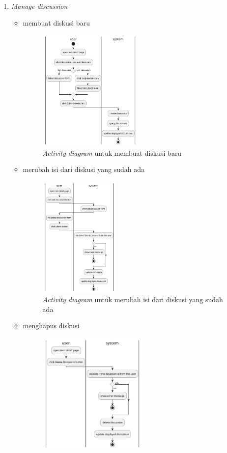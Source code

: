 \documentclass[a4paper]{article}
\begin{document}
\begin{enumerate}
\begin{enumerate}
        \item \textit{Manage discussion}
        \begin{itemize}
            \item membuat diskusi baru
            \begin{figure}[h]
                \centering
                \includegraphics*[height=6cm]{./diagram/activity diagram/14. discussion/create discussion/create discussion.png}
                \caption{\textit{Activity diagram} untuk membuat diskusi baru}
            \end{figure}
            \newpage
            \item merubah isi dari diskusi yang sudah ada
            \begin{figure}[h]
                \centering
                \includegraphics*[height=6cm]{./diagram/activity diagram/14. discussion/edit discussion/edit discussion.png}
                \caption{\textit{Activity diagram} untuk merubah isi dari diskusi yang sudah ada}
            \end{figure}
            \item menghapus diskusi
            \begin{figure}[h]
                \centering
                \includegraphics*[height=6cm]{./diagram/activity diagram/14. discussion/delete discussoin/delete discussion.png}

\end{figure}
\end{itemize}
\end{enumerate}
\end{enumerate}
\end{document}
